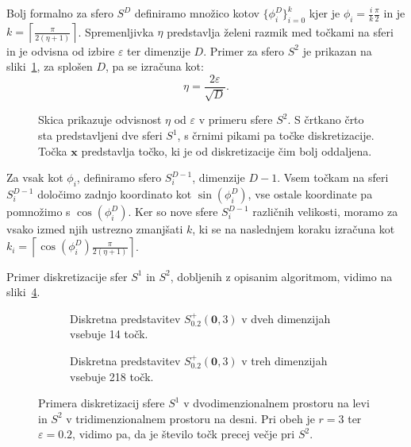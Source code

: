 Bolj formalno za sfero $S^D$ definiramo množico kotov $\{\phi^D_i\}_{i=0}^k$ kjer je $\phi_i = \frac{i}{k}\frac{\pi}{2}$ in je $k = \left\lceil \frac{\pi}{2 (\eta+1)} \right\rceil$. Spremenljivka $\eta$ predstavlja želeni razmik med točkami na sferi in je odvisna od izbire $\varepsilon$ ter dimenzije $D$. Primer za sfero $S^2$ je prikazan na sliki~\ref{fig:proof_h}, za splošen $D$, pa se izračuna kot:
\[
\eta = \frac{2 \varepsilon}{\sqrt{D}}.
\]
\begin{figure}[ht]
  \centering
  
  \caption{Skica prikazuje odvisnost $\eta$ od $\varepsilon$ v primeru sfere $S^2$. S črtkano črto sta predstavljeni dve sferi $S^1$, s črnimi pikami pa točke diskretizacije. Točka $\textbf{x}$ predstavlja točko, ki je od diskretizacije čim bolj oddaljena. }
  \label{fig:proof_h}
\end{figure}

Za vsak kot $\phi_i$, definiramo sfero $S^{D-1}_i$, dimenzije $D-1$. Vsem točkam na sferi $S^{D-1}_i$ določimo zadnjo koordinato kot $\sin(\phi^D_i)$, vse ostale koordinate pa pomnožimo s $\cos(\phi^D_i)$. Ker so nove sfere $S^{D-1}_i$ različnih velikosti, moramo za vsako izmed njih ustrezno zmanjšati $k$, ki se na naslednjem koraku izračuna kot $k_i = \left\lceil \cos(\phi^{D}_i) \frac{\pi}{2 (\eta+1)} \right\rceil$.

Primer diskretizacije sfer $S^1$ in $S^2$, dobljenih z opisanim algoritmom, vidimo na sliki~\ref{fig:epsilon_net}.

\begin{figure}[ht]
    \begin{subfigure}{0.45\textwidth}
        \centering
        
        \caption{Diskretna predstavitev $S^+_{0.2}(\textbf{0}, 3)$ v dveh dimenzijah vsebuje 14 točk.}
        \label{fig:epsilon_net_2d}
    \end{subfigure}
    \hfill
    \begin{subfigure}{0.45\textwidth}
        \centering
        
        \caption{Diskretna predstavitev $S^+_{0.2}(\textbf{0}, 3)$ v treh dimenzijah vsebuje 218 točk.}
        \label{fig:epsilon_net_3d}
    \end{subfigure}
    \caption{Primera diskretizacij sfere $S^1$ v dvodimenzionalnem prostoru na levi in $S^2$ v tridimenzionalnem prostoru na desni. Pri obeh je $r=3$ ter $\varepsilon = 0.2$, vidimo pa, da je število točk precej večje pri $S^2$.}
    \label{fig:epsilon_net}
\end{figure}



